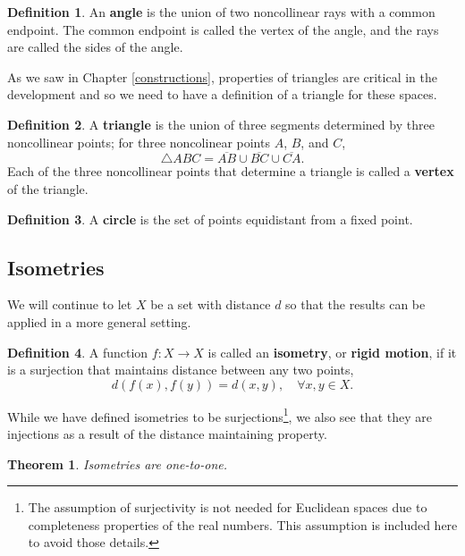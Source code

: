 \documentclass[
]{book}
\newtheorem{theorem}{Theorem}[chapter]
\theoremstyle{definition}
\newtheorem{definition}{Definition}[chapter]
\theoremstyle{definition}
\theoremstyle{definition}
\theoremstyle{definition}
\theoremstyle{remark}
\begin{document}
\begin{definition}
An \textbf{angle} is the union of two noncollinear rays with a common endpoint. The common endpoint is called the vertex of the angle, and the rays are called the sides of the angle.
\end{definition}

As we saw in Chapter \ref{constructions}, properties of triangles are critical in the development and so we need to have a definition of a triangle for these spaces.

\begin{definition}
A \textbf{triangle} is the union of three segments determined by three noncollinear points; for three noncolinear points \(A\), \(B\), and \(C\),
\[\triangle ABC = \overline{AB} \cup \overline{BC} \cup \overline {CA}.\] Each of the three noncollinear points that determine a triangle is called a \textbf{vertex} of the triangle.
\end{definition}

\begin{definition}
A \textbf{circle} is the set of points equidistant from a fixed point.
\end{definition}

\hypertarget{isometries}{%
\subsection{Isometries}\label{isometries}}

We will continue to let \(X\) be a set with distance \(d\) so that the results can be applied in a more general setting.

\begin{definition}
A function \(f:X\rightarrow X\) is called an \textbf{isometry}, or \textbf{rigid motion}, if it is a surjection that maintains distance between any two points, \[d(f(x),f(y))=d(x,y), \quad \forall x,y\in X.\]
\end{definition}

While we have defined isometries to be surjections\footnote{The assumption of surjectivity is not needed for Euclidean spaces due to completeness properties of the real numbers. This assumption is included here to avoid those details.}, we also see that they are injections as a result of the distance maintaining property.

\begin{theorem}
Isometries are one-to-one.
\end{theorem}
\end{document}
